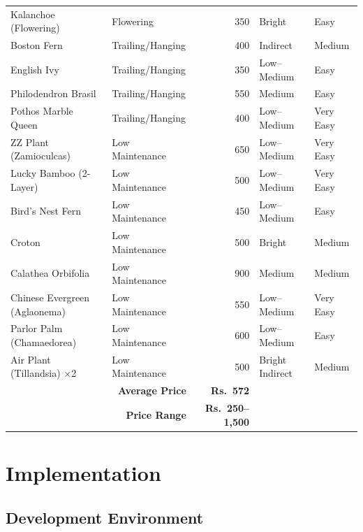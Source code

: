 \documentclass[12pt,a4paper]{report}
\begin{document}
\begin{longtable}{@{}llrll@{}}
Kalanchoe (Flowering)       & Flowering       &  350 & Bright         & Easy \\
Boston Fern                 & Trailing/Hanging&  400 & Indirect       & Medium \\
English Ivy                 & Trailing/Hanging&  350 & Low–Medium     & Easy \\
Philodendron Brasil         & Trailing/Hanging&  550 & Medium         & Easy \\
Pothos Marble Queen         & Trailing/Hanging&  400 & Low–Medium     & Very Easy \\
ZZ Plant (Zamioculcas)      & Low Maintenance &  650 & Low–Medium     & Very Easy \\
Lucky Bamboo (2-Layer)      & Low Maintenance &  500 & Low–Medium     & Very Easy \\
Bird's Nest Fern            & Low Maintenance &  450 & Low–Medium     & Easy \\
Croton                      & Low Maintenance &  500 & Bright         & Medium \\
Calathea Orbifolia          & Low Maintenance &  900 & Medium         & Medium \\
Chinese Evergreen (Aglaonema)& Low Maintenance& 550 & Low–Medium     & Very Easy \\
Parlor Palm (Chamaedorea)   & Low Maintenance &  600 & Low–Medium     & Easy \\
Air Plant (Tillandsia) ×2   & Low Maintenance &  500 & Bright Indirect& Medium \\
\midrule
\multicolumn{2}{r}{\textbf{Average Price}} & \textbf{Rs.\ 572} & & \\
\multicolumn{2}{r}{\textbf{Price Range}}   & \textbf{Rs.\ 250–1,500} & & \\
\bottomrule
\end{longtable}

\chapter{Implementation}

\section{Development Environment}
\end{document}
